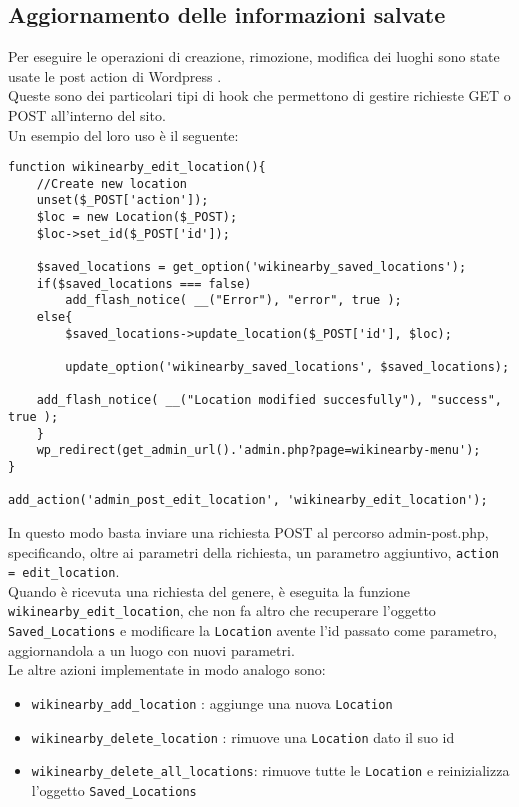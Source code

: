 \subsection*{Aggiornamento delle informazioni salvate}
Per eseguire le operazioni di creazione, rimozione, modifica dei luoghi sono state usate le post action di Wordpress \cite{postaction}.\\
Queste sono dei particolari tipi di hook che permettono di gestire richieste GET o POST all'interno del sito.\\
Un esempio del loro uso è il seguente:
\begin{lstlisting}
function wikinearby_edit_location(){
    //Create new location
    unset($_POST['action']);
    $loc = new Location($_POST);
	$loc->set_id($_POST['id']);

    $saved_locations = get_option('wikinearby_saved_locations');
    if($saved_locations === false)
		add_flash_notice( __("Error"), "error", true );
    else{
        $saved_locations->update_location($_POST['id'], $loc);

        update_option('wikinearby_saved_locations', $saved_locations);
		
	add_flash_notice( __("Location modified succesfully"), "success", true );
    }
    wp_redirect(get_admin_url().'admin.php?page=wikinearby-menu');
}

add_action('admin_post_edit_location', 'wikinearby_edit_location');
\end{lstlisting}

In questo modo basta inviare una richiesta POST al percorso admin-post.php, specificando, oltre ai parametri della richiesta, un parametro aggiuntivo, \texttt{action = edit\_location}.\\ 
Quando è ricevuta una richiesta del genere, è eseguita la funzione\\ \texttt{wikinearby\_edit\_location}, che non fa altro che recuperare l'oggetto \texttt{Saved\_Locations} e modificare la \texttt{Location} avente l'id passato come parametro, aggiornandola a un luogo con nuovi parametri.\\
Le altre azioni implementate in modo analogo sono:
\begin{itemize}
\item \texttt{wikinearby\_add\_location} : aggiunge una nuova \texttt{Location}
\item \texttt{wikinearby\_delete\_location} : rimuove una \texttt{Location} dato il suo id
\item \texttt{wikinearby\_delete\_all\_locations}: rimuove tutte le \texttt{Location} e reinizializza l'oggetto \texttt{Saved\_Locations}  
\end{itemize}

